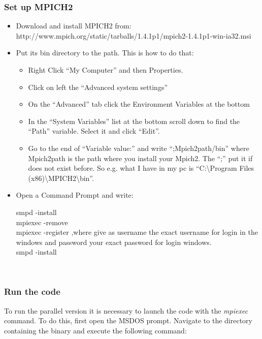 \subsubsection{Set up MPICH2}
\begin{itemize}
\item Download and install MPICH2 from:\\
http://www.mpich.org/static/tarballs/1.4.1p1/mpich2-1.4.1p1-win-ia32.msi
\item Put its bin directory to the path. This is how to do that:
  \begin{itemize}
	\item Right Click ``My Computer'' and then Properties.
	\item Click on left the ``Advanced system settings''
	\item On the ``Advanced'' tab click the Environment Variables at the bottom
	\item In the ``System Variables'' list at the bottom scroll down to find the ``Path'' variable.   Select it and click ``Edit''.
	\item Go to the end of ``Variable value:'' and write ``;Mpich2path/bin'' where Mpich2path is the  path where you install your Mpich2. The ``;'' put it if does not exist before. So e.g. what I have in my pc is ``C:\textbackslash Program Files (x86)\textbackslash MPICH2\textbackslash bin''.
  \end{itemize}
\item Open a Command Prompt and write:\\
  
  \begin{minipage}[c]{9cm}
	smpd  -install\\
	mpiexec -remove\\
	mpiexec -register   ,where give as username the exact username for login in the windows  and password your exact password for login windows.\\
	smpd -install\\
	\end{minipage}\\
\end{itemize}

\subsubsection{Run the code}
To run the parallel version it is necessary to launch the code with the \textit{mpiexec} command. To do this, first open the MSDOS prompt. Navigate to the directory containing the binary and execute the following command:\\

